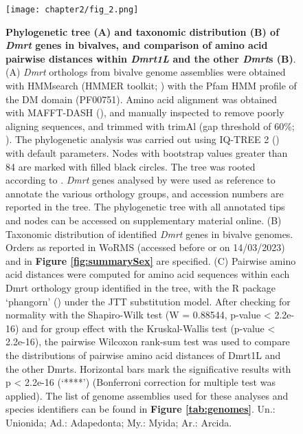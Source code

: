 \documentclass[../main.tex]{subfiles}
\begin{document}
\begin{figure}
    \centering
    \texttt{[image: chapter2/fig\_2.png]}
    \captionsetup{width=\textwidth}
    \caption{
    \textbf{Phylogenetic tree (A) and taxonomic distribution (B) of \textit{Dmrt} genes in bivalves, and comparison of amino acid pairwise distances within \textit{Dmrt1L} and the other \textit{Dmrt}s (B)}. (A) \textit{Dmrt} orthologs from bivalve genome assemblies were obtained with HMMsearch (HMMER toolkit; \textbf{\cite{eddy2011accelerated}}) with the Pfam HMM profile of the DM domain (PF00751). Amino acid alignment was obtained with MAFFT-DASH (\textbf{\cite{rozewicki2019mafft}}), and manually inspected to remove poorly aligning sequences, and trimmed with trimAl (gap threshold of 60\%; \textbf{\cite{capella2009trimal}}). The phylogenetic analysis was carried out using IQ-TREE 2 (\textbf{\cite{minh2020iq}}) with default parameters. Nodes with bootstrap values greater than 84 are marked with filled black circles. The tree was rooted according to \textbf{\cite{evensen2022comparative}}. \textit{Dmrt} genes analysed by \textbf{\cite{evensen2022comparative}} were used as reference to annotate the various orthology groups, and accession numbers are reported in the tree. The phylogenetic tree with all annotated tips and nodes can be accessed on supplementary material online. (B) Taxonomic distribution of identified \textit{Dmrt} genes in bivalve genomes. Orders as reported in WoRMS (accessed before or on 14/03/2023) and in \textbf{Figure \ref{fig:summarySex}} are specified. (C) Pairwise amino acid distances were computed for amino acid sequences within each Dmrt orthology group identified in the tree, with the R package ‘phangorn’ (\textbf{\cite{schliep2011phangorn}}) under the JTT substitution model. After checking for normality with the Shapiro-Wilk test (W = 0.88544, p-value < 2.2e-16) and for group effect with the Kruskal-Wallis test (p-value < 2.2e-16), the pairwise Wilcoxon rank-sum test was used to compare the distributions of pairwise amino acid distances of Dmrt1L and the other Dmrts. Horizontal bars mark the significative results with p < 2.2e-16 (‘****’) (Bonferroni correction for multiple test was applied). The list of genome assemblies used for these analyses and species identifiers can be found in \textbf{Figure \ref{tab:genomes}}. Un.: Unionida; Ad.: Adapedonta; My.: Myida; Ar.: Arcida.
    }
    
    \label{fig:dmrt}
\end{figure}
\end{document}
